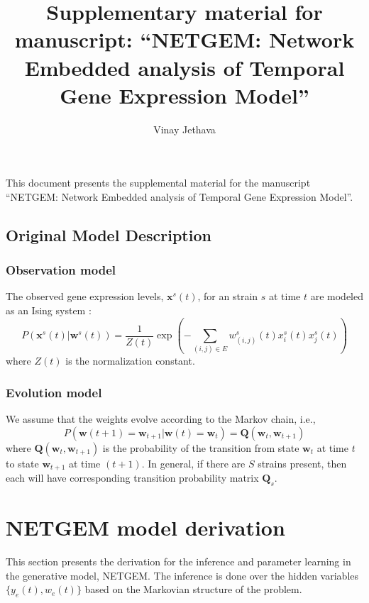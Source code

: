 \documentclass[11pt]{article}
\title{Supplementary material for manuscript:  ``NETGEM: Network Embedded analysis of Temporal Gene Expression Model''}
\author{Vinay Jethava}
\begin{document}
\maketitle

\setcounter{tocdepth}{3}
\vspace*{1cm}

This document presents the supplemental material for the manuscript
``NETGEM: Network Embedded analysis of Temporal Gene Expression
Model''.  

\subsection{Original Model Description}

\subsubsection{Observation model}
\label{observation-model}

The observed gene expression levels, $\mathbf{x}^{s}(t)$, for an strain
$s$ at time $t$ are modeled as an Ising system \cite{Song09KELLER}:
\begin{equation}
\label{eq:ising}
 P\left(\mathbf{x}^{s}(t) | \mathbf{w}^{s}(t)\right) = 
      \frac{1}{Z(t)} \exp \left( - \sum_{(i,j) \in E} w^s_{(i,j)}(t)
        x^{s}_i(t) x^{s}_j(t)\right)  
\end{equation}
where $Z(t)$ is the normalization constant. 

\subsubsection{Evolution model }
\label{sec:evolution-model}
We assume that the weights evolve according to the Markov chain, i.e.,
\begin{equation}
  \label{eq:q-evol}
 P(\mathbf{w}(t+1) = \mathbf{w}_{t+1} |  \mathbf{w}(t) = \mathbf{w}_{t}) = \mathbf{Q}(\mathbf{w}_{t}, \mathbf{w}_{t+1})
\end{equation}
where $\mathbf{Q}(\mathbf{w}_{t}, \mathbf{w}_{t+1})$ is the probability of the
transition from state $\mathbf{w}_{t}$ at time $t$ to state
$\mathbf{w}_{t+1}$ at time $(t+1)$. In general, if there are $S$
strains present, then each will have corresponding transition
probability matrix $\mathbf{Q}_{s}$. 


\section{ NETGEM model derivation}
\label{sec:mixt-model-deriv}
This section presents the derivation for the inference and parameter
learning in the generative model, NETGEM. The inference is done over
the hidden variables $\{y_{e}(t), w_{e}(t)\}$ based on the Markovian structure of the problem.
\end{document}
